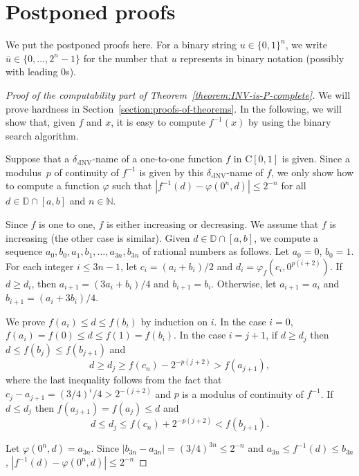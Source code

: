 \documentclass[envcountsect,envcountsame,orivec,oribibl]{llncs}
\newcommand{\N}{\mathbb N}
\newcommand{\D}{\mathbb D}
\newcommand{\deltaboxINV}{\delta _{\square \mathrm{INV}}}
\newcommand{\classC}{\mathrm C}
\begin{document}
\clearpage

\appendix

\section{Postponed proofs}

We put the postponed proofs here. 
For a binary string $u \in \{0, 1\} ^n$, 
we write $\overline u \in \{0, \ldots, 2 ^n - 1\}$ for the 
number that $u$ represents in binary notation 
(possibly with leading 0s). 

\begin{proof}[Proof of the computability part of Theorem~\ref{theorem:INV-is-P-complete}]
We will prove hardness in Section~\ref{section:proofs-of-theorems}.
In the following, we will show that, 
given $f$ and $x$, 
it is easy to compute $f^{-1}(x)$ by using the binary search algorithm.

Suppose that a $\deltaboxINV$-name of a one-to-one function $f$ in $\classC [0, 1]$ is given. 
Since a modulus~$p$ of continuity of $f ^{-1}$ is given by this $\deltaboxINV$-name of $f$,
we only show how to compute a function $\varphi$ such that 
$|f^{-1}(d) - \varphi(0^n, d)| \le 2^{-n}$ for all $d \in \D \cap [a, b]$ and $n \in \N$.

Since $f$ is one to one, $f$ is either increasing or decreasing. 
We assume that $f$ is increasing (the other case is similar).
Given $d \in \D \cap [a, b]$, 
we compute a sequence  $a_0, b_0, a_1,b_1, \dots, a_{3n}, b_{3n}$ of rational numbers as follows.
Let $a_0 = 0$, $b_0 = 1$.
For each integer $i \le 3n-1$,
let $c_i = (a_i+b_i)/2$ and $d_i = \varphi_f(c_i, 0^{p(i+2)})$.
If $d \ge d_i$, then $a_{i+1} = (3a_i+b_i)/4$ and $b_{i+1} = b_i$. 
Otherwise, let $a_{i+1} = a_i$ and $b_{i+1} = (a_i+3b_i)/4$.

We prove $f(a_i) \leq d \leq f(b_i)$ by induction on $i$.
In the case $i = 0$, $f(a_i) = f(0) \le d \le f(1) = f(b_i)$.
In the case $i=j+1$, if $d \ge d_j$ then $d \le f(b_j) \le f(b_{j+1})$ and
\begin{equation}
 d \ge d_j \ge f(c_n) - 2^{-p(j+2)} > f(a_{j+1}),
\end{equation}
where the last inequality follows from the fact that $c_j - a_{j+1} = (3/4)^i/4 > 2^{-(j+2)}$ and $p$ is a modulus of continuity of $f^{-1}$.
If $d \le d_j$ then $f(a_{j+1}) = f(a_j) \le d$ and 
\begin{equation}
 d \le d_j \le f(c_n) + 2^{-p(j+2)} < f(b_{j+1}).
\end{equation}

Let $\varphi(0^n, d) = a_{3n}$.
Since $|b_{3n} - a_{3n}| = (3/4)^{3n} \le 2^{-n}$ and
$a_{3n} \le f^{-1}(d) \le b_{3n}$,
$|f^{-1}(d) - \varphi(0^n, d)| \le 2^{-n}$
\end{proof}
\end{document}
